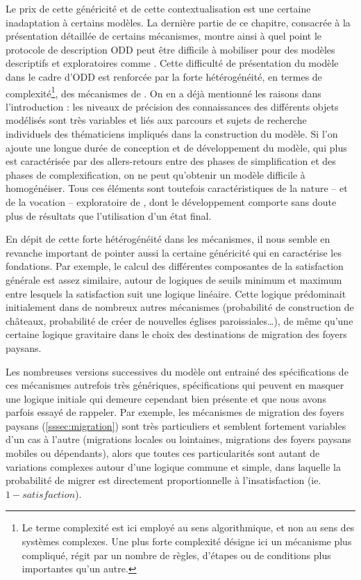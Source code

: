 Le prix de cette généricité et de cette contextualisation est une certaine inadaptation à certains modèles.
La dernière partie de ce chapitre, consacrée à la présentation détaillée de certains mécanismes, montre ainsi à quel point le protocole de description ODD peut être difficile à mobiliser pour des modèles descriptifs et exploratoires comme \simfeodal{}.
Cette difficulté de présentation du modèle dans le cadre d'ODD est renforcée par la forte hétérogénéité, en termes de complexité\footnote{
Le terme complexité est ici employé au sens algorithmique, et non au sens des systèmes complexes.
Une plus forte complexité désigne ici un mécanisme plus \og compliqué\fg{}, régit par un nombre de règles, d'étapes ou de conditions plus importantes qu'un autre.
}, des mécanismes de \simfeodal{}.
On en a déjà mentionné les raisons dans l'introduction :
	les niveaux de précision des connaissances des différents objets modélisés sont très variables et liés aux parcours et sujets de recherche individuels des thématiciens impliqués dans la construction du modèle.
Si l'on ajoute une \og longue durée\fg{} de conception et de développement du modèle, qui plus est caractérisée par des allers-retours entre des phases de simplification et des phases de complexification, on ne peut qu'obtenir un modèle difficile à homogénéiser.
Tous ces éléments sont toutefois caractéristiques de la nature -- et de la vocation -- exploratoire de \simfeodal{}, dont le développement comporte sans doute plus de résultats que l'utilisation d'un état \og final\fg{}.

En dépit de cette forte hétérogénéité dans les mécanismes, il nous semble en revanche important de pointer aussi la certaine généricité qui en caractérise les fondations.
Par exemple, le calcul des différentes composantes de la satisfaction générale est assez similaire, autour de logiques de seuils minimum et maximum entre lesquels la satisfaction suit une logique linéaire.
Cette logique prédominait initialement dans de nombreux autres mécanismes (probabilité de construction de châteaux, probabilité de créer de nouvelles églises paroissiales\ldots), de même qu'une certaine logique gravitaire dans le choix des destinations de migration des foyers paysans.

Les nombreuses versions successives du modèle ont entrainé des spécifications de ces mécanismes autrefois très génériques, spécifications qui peuvent en masquer une logique initiale qui demeure cependant bien présente et que nous avons parfois essayé de rappeler.
Par exemple, les mécanismes de migration des foyers paysans (\cref{sssec:migration}) sont très particuliers et semblent fortement variables d'un cas à l'autre (migrations locales ou lointaines, migrations des foyers paysans \og mobiles\fg{} ou \og dépendants\fg{}), alors que toutes ces particularités sont autant de variations complexes autour d'une logique commune et simple, dans laquelle la probabilité de migrer est directement proportionnelle à l'insatisfaction (ie. $1 - satisfaction$).

